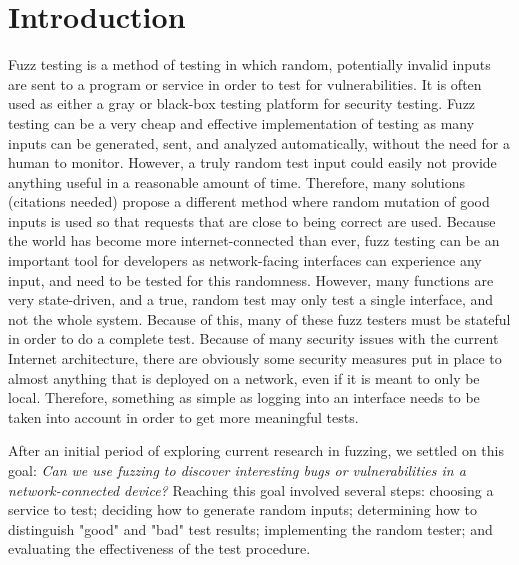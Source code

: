 \documentclass[letterpaper,twocolumn,10pt]{article}
\begin{document}
\section{Introduction}

Fuzz testing is a method of testing in which random, potentially invalid inputs are sent to a program or service in order to test for vulnerabilities. It is often used as either a gray or black-box testing platform for security testing. Fuzz testing can be a very cheap and effective implementation of testing as many inputs can be generated, sent, and analyzed automatically, without the need for a human to monitor. However, a truly random test input could easily not provide anything useful in a reasonable amount of time. Therefore, many solutions (citations needed) propose a different method where random mutation of good inputs is used so that requests that are close to being correct are used. 
Because the world has become more internet-connected than ever, fuzz testing can be an important tool for developers as network-facing interfaces can experience any input, and need to be tested for this randomness. However, many functions are very state-driven, and a true, random test may only test a single interface, and not the whole system. Because of this, many of these fuzz testers must be stateful in order to do a complete test. Because of many security issues with the current Internet architecture, there are obviously some security measures put in place to almost anything that is deployed on a network, even if it is meant to only be local. Therefore, something as simple as logging into an interface needs to be taken into account in order to get more meaningful tests.

After an initial period of exploring current research in fuzzing, we settled on this goal: \textit{Can we use fuzzing to discover interesting bugs or vulnerabilities in a network-connected device?} Reaching this goal involved several steps: choosing a service to test; deciding how to generate random inputs; determining how to distinguish "good" and "bad" test results; implementing the random tester; and evaluating the effectiveness of the test procedure. 
\end{document}
